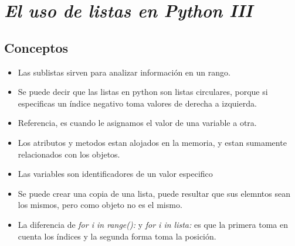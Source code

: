 \documentclass{book}
\begin{document}
	\section{\textit{El uso de listas en Python III}}

\begin{flushright}
	\date{22 de enero de 2019}
\end{flushright}

	\subsection {Conceptos}
	\begin{itemize}
		\item Las sublistas sirven para analizar información en un rango.
		\item Se puede decir que las listas en python son listas circulares, porque si especificas un índice negativo toma valores de derecha a izquierda.
		\item Referencia, es cuando le asignamos el valor de una variable a otra.
		\item Los atributos y metodos estan alojados en la memoria, y estan sumamente relacionados con los objetos.
		\item Las variables son identificadores de un valor especifico
		\item Se puede crear una copia de una lista, puede resultar que sus elemntos sean los mismos, pero como objeto no es el mismo.
		\item La diferencia de \textit{for i in range():} y \textit{for i in lista:} es que la primera toma en cuenta los índices y la segunda forma toma la posición.
	\end{itemize}
	
	
	
\end{document}
